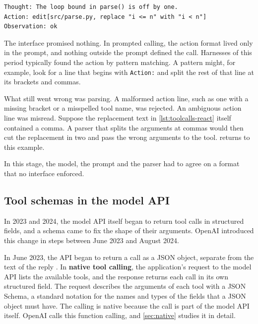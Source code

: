 \begin{lstlisting}[float=tbp, basicstyle=\ttfamily\footnotesize, caption={An illustrative tool call written as text, in the style of ReAct.}, label=lst:toolcalls-react]
Thought: The loop bound in parse() is off by one.
Action: edit[src/parse.py, replace "i <= n" with "i < n"]
Observation: ok
\end{lstlisting}

The interface promised nothing. In prompted calling, the action format lived only in the prompt, and
nothing outside the prompt defined the call. Harnesses of this period typically found the action by
pattern matching. A pattern might, for example, look for a line that begins with \texttt{Action:}
and split the rest of that line at its brackets and commas.

What still went wrong was parsing. A malformed action line, such as one with a missing bracket or a
misspelled tool name, was rejected. An ambiguous action line was misread. Suppose the replacement text
in \cref{lst:toolcalls-react} itself contained a comma. A parser that splits the arguments at commas
would then cut the replacement in two and pass the wrong arguments to the tool. 
returns to this example.

In this stage, the model, the prompt and the parser had to agree on a format that no interface
enforced.

\subsection{Tool schemas in the model API}
\label{sec:toolcalls-schemas}

In 2023 and 2024, the model API itself began to return tool calls in structured fields, and a schema
came to fix the shape of their arguments. OpenAI introduced this change in steps between June 2023
and August 2024.

In June 2023, the API began to return a call as a JSON object, separate from the text of the reply
\citep{openai2023functioncalling}. In \textbf{native tool calling}, the application's request to the
model API lists the available tools, and the response returns each call in its own structured field.
The request describes the arguments of each tool with a JSON Schema, a standard notation for the
names and types of the fields that a JSON object must have. The calling is native because the call
is part of the model API itself. OpenAI calls this function calling, and \cref{sec:native} studies it
in detail.

